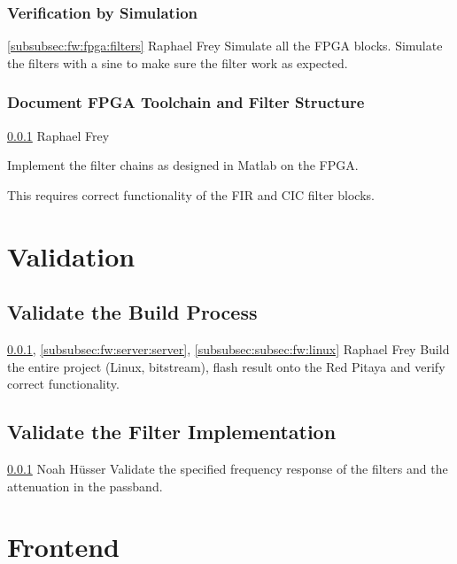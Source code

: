 \documentclass[a4paper,oneside]{alpenspecs/alpenspecs}
\begin{document}
\subsubsection{Verification by Simulation}
\label{subsubsec:fw:fpga:sim}
\wpac
    {}
    {}
    {}
    {\ref{subsubsec:fw:fpga:filters}}
    {}
    {Raphael Frey}
    {%
        Simulate all the FPGA blocks.
        Simulate the filters with a sine to make sure the filter work as expected.
    }

\subsubsection{Document FPGA Toolchain and Filter Structure}
\label{subsubsec:fw:fpga:doc}
\wpac
    {}
    {}
    {}
    {\ref{subsubsec:fw:fpga:sim}}
    {}
    {Raphael Frey}
    {%
        Implement the filter chains as designed in Matlab on the FPGA.

        This requires correct functionality of the FIR and CIC filter
        blocks.
    }

\section{Validation}
\label{sec:validation}

\subsection{Validate the Build Process}
\label{subsec:validation:build}
\wpac
    {}
    {}
    {}
    {\ref{subsubsec:fw:fpga:sim}, \ref{subsubsec:fw:server:server}, \ref{subsubsec:subsec:fw:linux}}
    {}
    {Raphael Frey}
    {%
        Build the entire project (Linux, bitstream), flash
        result onto the Red Pitaya and verify correct functionality.
    }

\subsection{Validate the Filter Implementation}
\label{subsec:validation:impl}
\wpac
    {}
    {}
    {}
    {\ref{subsubsec:fw:fpga:sim}}
    {}
    {Noah Hüsser}
    {%
        Validate the specified frequency response of the filters and the attenuation in the passband.
    }

\section{Frontend}
\label{sec:frontend}
\end{document}

